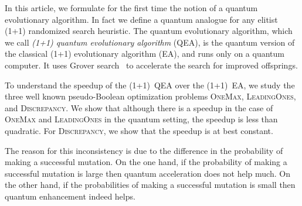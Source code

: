 
In this article, we formulate for the first time the notion of a quantum evolutionary algorithm. In fact we define a quantum analogue for any elitist (1+1) randomized search heuristic. The quantum evolutionary algorithm, which we call \emph{(1+1) quantum evolutionary algorithm} (QEA), is the quantum version of the classical (1+1) evolutionary algorithm (EA), and runs only on a quantum computer. It uses Grover search~\cite{Grover96} to accelerate the search for improved offsprings.

To understand the speedup of the (1+1)~QEA over the (1+1)~EA, we study the three well known pseudo-Boolean optimization problems \textsc{OneMax}, \textsc{LeadingOnes}, and \textsc{Discrepancy}. We show that although there is a speedup in the case of \textsc{OneMax} and \textsc{LeadingOnes} in the quantum setting, the speedup is less than quadratic. For \textsc{Discrepancy}, we show that the speedup is at best constant. 

The reason for this inconsistency is due to the difference in the probability of making a successful mutation. On the one hand, if the probability of making a successful mutation is large then quantum acceleration does not help much. On the other hand, if the probabilities of making a successful mutation is small then quantum enhancement indeed helps.


